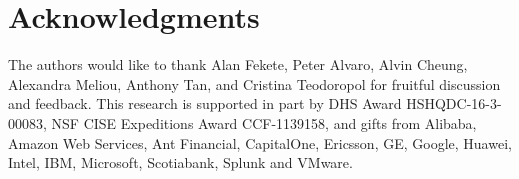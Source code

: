 \section{Acknowledgments}
The authors would like to thank Alan Fekete, Peter Alvaro, Alvin Cheung,
Alexandra Meliou, Anthony Tan, and Cristina Teodoropol for fruitful discussion
and feedback.
%
This research is supported in part by DHS Award HSHQDC-16-3-00083, NSF CISE
Expeditions Award CCF-1139158, and gifts from Alibaba, Amazon Web Services, Ant
Financial, CapitalOne, Ericsson, GE, Google, Huawei, Intel, IBM, Microsoft,
Scotiabank, Splunk and VMware.
